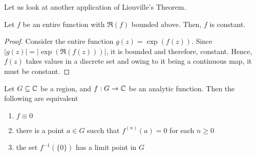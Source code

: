 Let us look at another application of Liouville's Theorem. 
\begin{example}
    Let $f$ be an entire function with $\Re(f)$ bounded above. Then, $f$ is constant.
\end{example}
\begin{proof}
    Consider the entire function $g(z) = \exp(f(z))$. Since $|g(z)| = |\exp(\Re(f(z)))|$, it is bounded and therefore, constant. Hence, $f(z)$ takes values in a discrete set and owing to it being a continuous map, it must be constant.
\end{proof}

\begin{theorem}
    Let $G\subseteq\mathbb{C}$ be a region, and $f: G\to\mathbb{C}$ be an analytic function. Then the following are equivalent 
    \begin{enumerate}[label=(\alph*)]
        \item $f\equiv 0$ 
        \item there is a point $a\in G$ succh that $f^{(n)}(a) = 0$ for each $n\ge 0$ 
        \item the set $f^{-1}(\{0\})$ has a limit point in $G$ 
    \end{enumerate}
\end{theorem}
